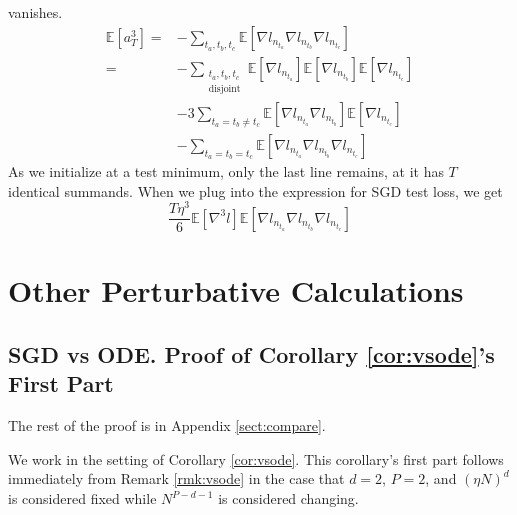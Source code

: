 \documentclass{article}
\theoremstyle{plain}
\theoremstyle{definition}
\newcommand{\expct}[1]{\mathbb{E}\left[#1\right]}
\begin{document}
\begin{shaded}
            vanishes.
            \begin{align*}
                \expct{a_T^3}
                    =&- \sum_{t_a, t_b, t_c}
                            \expct{\nabla l_{n_{t_a}} \nabla l_{n_{t_b}} \nabla l_{n_{t_c}}}
                    \\
                    =&- \sum_{\substack{t_a, t_b, t_c\\ \text{disjoint}}}  
                            \expct{\nabla l_{n_{t_a}}} \expct{\nabla l_{n_{t_b}}} \expct{\nabla l_{n_{t_c}}}
                    \\&-3 \sum_{t_a=t_b\neq t_c}  
                            \expct{\nabla l_{n_{t_a}} \nabla l_{n_{t_b}}} \expct{\nabla l_{n_{t_c}}}
                    \\&-\sum_{t_a=t_b=t_c}  
                            \expct{\nabla l_{n_{t_a}} \nabla l_{n_{t_b}} \nabla l_{n_{t_c}}}
            \end{align*}
            As we initialize at a test minimum, only the last line remains, at
            it has $T$ identical summands.
            When we plug into the expression for SGD test loss, we get
            $$
                \frac{T \eta^3 }{6}
                \expct{\nabla^3 l}
                \expct{\nabla l_{n_{t_a}} \nabla l_{n_{t_b}} \nabla l_{n_{t_c}}}
            $$
        \end{shaded}

\section{Other Perturbative Calculations} \label{sect:calculations}
    \subsection{
        SGD vs ODE.  Proof of Corollary \ref{cor:vsode}'s First Part
    }
        The rest of the proof is in Appendix \ref{sect:compare}.

        We work in the setting of Corollary \ref{cor:vsode}.
        This corollary's first part follows immediately from
        Remark \ref{rmk:vsode} in the case that $d=2$, $P=2$,
        and $(\eta N)^d$ is considered fixed while $N^{P-d-1}$ is considered changing.
\end{document}
